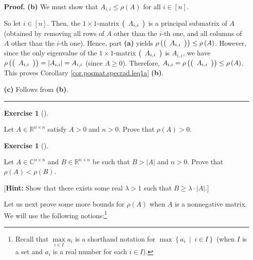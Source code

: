 \documentclass[numbers=enddot,12pt,final,onecolumn,notitlepage]{scrartcl}%
\newcounter{exer}
\numberwithin{exer}{subsection}
\theoremstyle{definition}
\newtheorem{exmp}[exer]{Exercise}
\newenvironment{exercise}[1][]
{\begin{exmp}[#1]\begin{leftbar}}
{\end{leftbar}\end{exmp}}
\newenvironment{proof}[1][Proof]{\noindent\textbf{#1.} }{\ \rule{0.5em}{0.5em}}
\begin{document}
\begin{proof}
\textbf{(b)} We must show that $A_{i,i}\leq\rho\left(  A\right)  $ for all
$i\in\left[  n\right]  $.

So let $i\in\left[  n\right]  $. Then, the $1\times1$-matrix $\left(
\begin{array}
[c]{c}%
A_{i,i}%
\end{array}
\right)  $ is a principal submatrix of $A$ (obtained by removing all rows of
$A$ other than the $i$-th one, and all columns of $A$ other than the $i$-th
one). Hence, part \textbf{(a)} yields $\rho\left(  \left(
\begin{array}
[c]{c}%
A_{i,i}%
\end{array}
\right)  \right)  \leq\rho\left(  A\right)  $. However, since the only
eigenvalue of the $1\times1$-matrix $\left(
\begin{array}
[c]{c}%
A_{i,i}%
\end{array}
\right)  $ is $A_{i,i}$, we have $\rho\left(  \left(
\begin{array}
[c]{c}%
A_{i,i}%
\end{array}
\right)  \right)  =\left\vert A_{i,i}\right\vert =A_{i,i}$ (since $A\geq0$).
Therefore, $A_{i,i}=\rho\left(  \left(
\begin{array}
[c]{c}%
A_{i,i}%
\end{array}
\right)  \right)  \leq\rho\left(  A\right)  $. This proves Corollary
\ref{cor.posmat.specrad.leq1a} \textbf{(b)}. \medskip

\textbf{(c)} Follows from \textbf{(b)}.
\end{proof}

\begin{exercise}
 Let $A\in\mathbb{R}^{n\times n}$ satisfy $A>0$ and $n>0$. Prove that
$\rho\left(  A\right)  >0$.
\end{exercise}

\begin{exercise}
 Let $A\in\mathbb{C}^{n\times n}$ and $B\in\mathbb{R}^{n\times n}$ be
such that $B>\left\vert A\right\vert $ and $n>0$. Prove that $\rho\left(
A\right)  <\rho\left(  B\right)  $. \medskip

[\textbf{Hint:} Show that there exists some real $\lambda>1$ such that
$B\geq\lambda\cdot\left\vert A\right\vert $.]
\end{exercise}

Let us next prove some more bounds for $\rho\left(  A\right)  $ when $A$ is a
nonnegative matrix. We will use the following notions:\footnote{Recall that
$\max\limits_{i\in I}a_{i}$ is a shorthand notation for $\max\left\{
a_{i}\ \mid\ i\in I\right\}  $ (when $I$ is a set and $a_{i}$ is a real number
for each $i\in I$).}
\end{document}
